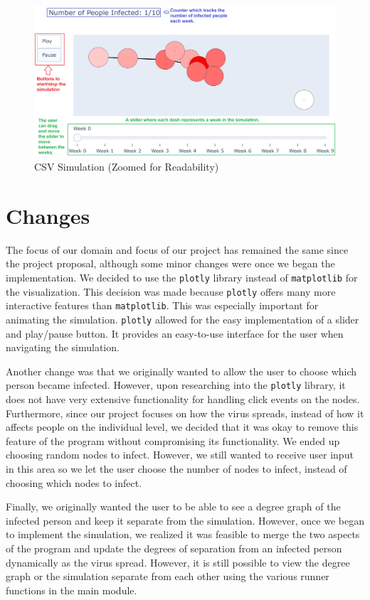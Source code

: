 \documentclass[fontsize=11pt]{article}
\begin{document}
    \begin{figure}[h]
        \centering
        \includegraphics[width=170mm,scale=0.3]{pictures/run_csv_simulation.png}
        \caption{CSV Simulation (Zoomed for Readability)}
    \end{figure}
    \newpage
    \section*{Changes}
    The focus of our domain and focus of our project has remained the same since the project proposal, although some minor changes were once we began the implementation. We decided to use the \texttt{plotly} library instead of \texttt{matplotlib} for the visualization. This decision was made because \texttt{plotly} offers many more interactive features than \texttt{matplotlib}. This was especially important for animating the simulation. \texttt{plotly} allowed for the easy implementation of a slider and play/pause button. It provides an easy-to-use interface for the user when navigating the simulation.

    Another change was that we originally wanted to allow the user to choose which person became infected. However, upon researching into the \texttt{plotly} library, it does not have very extensive functionality for handling click events on the nodes. Furthermore, since our project focuses on how the virus spreads, instead of how it affects people on the individual level, we decided that it was okay to remove this feature of the program without compromising its functionality. We ended up choosing random nodes to infect. However, we still wanted to receive user input in this area so we let the user choose the number of nodes to infect, instead of choosing which nodes to infect.

    Finally, we originally wanted the user to be able to see a degree graph of the infected person and keep it separate from the simulation. However, once we began to implement the simulation, we realized it was feasible to merge the two aspects of the program and update the degrees of separation from an infected person dynamically as the virus spread. However, it is still possible to view the degree graph or the simulation separate from each other using the various runner functions in the main module.
\end{document}
